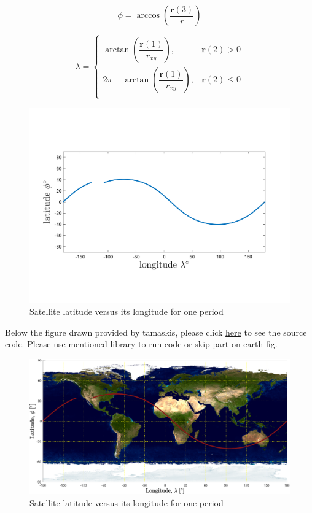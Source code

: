     $$
    \phi = \arccos(\dfrac{\boldsymbol r(3)}{r})
    $$

    $$
    \lambda = 
\begin{cases}
    \arctan(\dfrac{\boldsymbol r(1)}{r_{xy}}),& \boldsymbol r(2) > 0\\
    2\pi-\arctan(\dfrac{\boldsymbol r(1)}{r_{xy}}),& \boldsymbol r(2) \leq 0\\
\end{cases}
    $$

    \begin{figure}[H]
        \caption{Satellite latitude versus its longitude for one period}
        \centering
        \includegraphics[width=16cm]{../Figure/Short_project/latlong}
    \end{figure}

    Below the figure drawn provided by tamaskis, please click \href{https://github.com/tamaskis/ground_track-MATLAB}{here} to see the source code. Please use mentioned library to run code or skip part on earth fig.

    \begin{figure}[H]
        \caption{Satellite latitude versus its longitude for one period}
        \centering
        \includegraphics[width=16cm]{../Figure/Short_project/latlong_earth}
    \end{figure}

